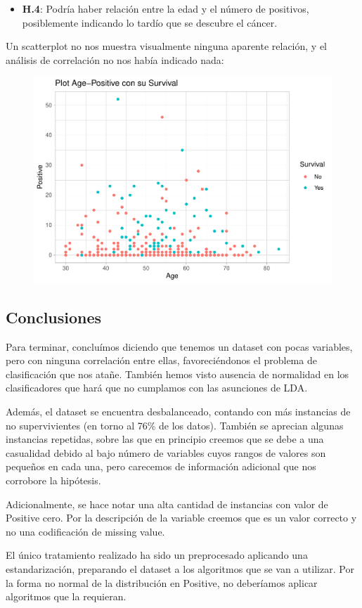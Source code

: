 \newpage

\begin{itemize}
\item \textbf{H.4}: Podría haber relación entre la edad y el número de positivos,
posiblemente indicando lo tardío que se descubre el cáncer.
\end{itemize}

Un scatterplot no nos muestra visualmente ninguna aparente relación, y el análisis de correlación no nos había indicado nada:

\begin{figure}[H]\includegraphics[width=.9\linewidth]{img/EDA2_files/figure-latex/unnamed-chunk-37-1} \caption{}\end{figure}

\subsection{Conclusiones}

Para terminar, concluímos diciendo que tenemos un dataset con pocas variables, pero con ninguna correlación entre ellas, favoreciéndonos el problema de clasificación que nos atañe. 
También hemos visto ausencia de normalidad en los clasificadores que hará que no cumplamos con las asunciones de LDA.

\vspace{\baselineskip}

Además, el dataset se encuentra desbalanceado, contando con más instancias de no supervivientes (en torno al 76\% de los datos). También se aprecian algunas instancias repetidas, sobre las que en principio creemos que se debe a una casualidad debido al bajo número de variables cuyos rangos de valores son pequeños en cada una, pero carecemos de información adicional que nos corrobore la hipótesis.

Adicionalmente, se hace notar una alta cantidad de instancias con valor de Positive cero. Por la descripción de la variable creemos que es un valor correcto y no una codificación de missing value.

\vspace{\baselineskip}

El único tratamiento realizado ha sido un preprocesado aplicando una estandarización, preparando el dataset a los algoritmos que se van a utilizar. Por la forma no normal de la distribución en Positive, no deberíamos aplicar algoritmos que la requieran.